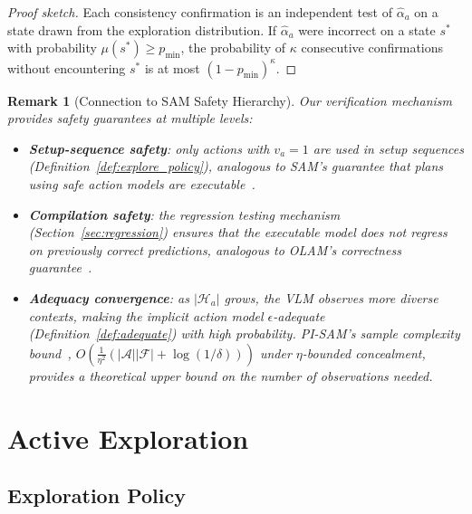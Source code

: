 \documentclass{article}
\newtheorem{remark}{Remark}
\newcommand{\calA}{\mathcal{A}}
\newcommand{\calF}{\mathcal{F}}
\newcommand{\calH}{\mathcal{H}}
\begin{document}
\begin{proof}[Proof sketch]
Each consistency confirmation is an independent test of $\hat{\alpha}_a$ on a state drawn from the exploration distribution.  If $\hat{\alpha}_a$ were incorrect on a state $s^*$ with probability $\mu(s^*) \geq p_{\min}$, the probability of $\kappa$ consecutive confirmations without encountering $s^*$ is at most $(1 - p_{\min})^\kappa$.
\end{proof}

\begin{remark}[Connection to SAM Safety Hierarchy]
Our verification mechanism provides safety guarantees at multiple levels:
\begin{itemize}[nosep]
    \item \textbf{Setup-sequence safety}: only actions with $v_a = 1$ are used in setup sequences (Definition~\ref{def:explore_policy}), analogous to SAM's guarantee that plans using safe action models are executable~\cite{juba2021safe}.
    \item \textbf{Compilation safety}: the regression testing mechanism (Section~\ref{sec:regression}) ensures that the executable model does not regress on previously correct predictions, analogous to OLAM's correctness guarantee~\cite{lamanna2021olam}.
    \item \textbf{Adequacy convergence}: as $|\calH_a|$ grows, the VLM observes more diverse contexts, making the implicit action model $\epsilon$-adequate (Definition~\ref{def:adequate}) with high probability.  PI-SAM's sample complexity bound~\cite{le2024pisam}, $O(\frac{1}{\eta^2}(|\calA||\calF| + \log(1/\delta)))$ under $\eta$-bounded concealment, provides a theoretical upper bound on the number of observations needed.
\end{itemize}
\end{remark}



\section{Active Exploration}
\label{sec:exploration}

\subsection{Exploration Policy}
\label{sec:explore_policy}
\end{document}
